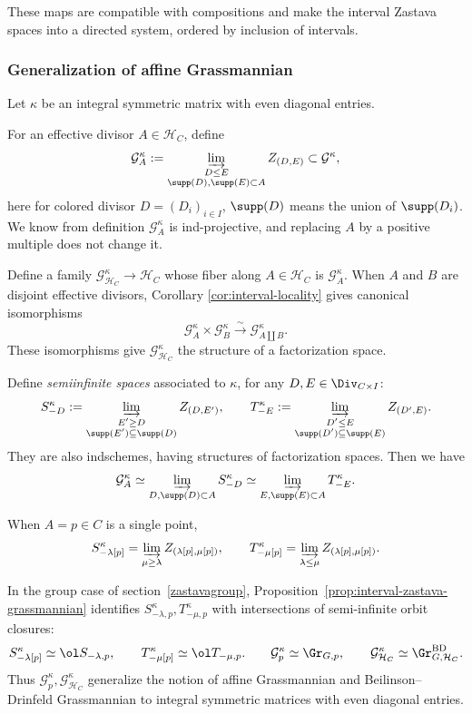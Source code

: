 \documentclass{amsart}
\numberwithin{equation}{section}
\numberwithin{figure}{section}
\theoremstyle{definition}
\theoremstyle{remark}
\renewcommand{\c}[1]{\mathcal{#1}}
\begin{document}
These maps are compatible with compositions and make the
interval Zastava spaces into a directed system, ordered by inclusion of intervals.

\subsubsection{Generalization of affine Grassmannian}
Let $\kappa$ be an integral symmetric matrix with even
diagonal entries.

For an effective divisor $A\in\c H_C$, define
\[\c G^\kappa_A
:=
\varinjlim_{\substack{	D\leq E\\\supp(D),\supp(E)\subset A}}
Z_{(D,E)}\subset\c G^\kappa,\]
here for colored divisor $D=(D_i)_{i\in I}$, $\supp(D)$ means the union of $\supp(D_i)$.
We know from definition $\c G^\kappa_A$ is ind-projective, and
replacing $A$ by a positive multiple does not change it.

Define a family $\c G^\kappa_{\c H_C}\to\c H_C$ whose fiber along $A\in \c H_C$ is $\c G^\kappa_A$. When $A$ and $B$ are disjoint effective divisors, Corollary \ref{cor:interval-locality} gives canonical isomorphisms
\[
\c G^\kappa_A\times\c G^\kappa_B
\xrightarrow{\sim}
\c G^\kappa_{A\coprod B}.
\]
These isomorphisms give
$\c G^\kappa_{\c H_C}$ the structure of a factorization space.

Define \textit{semiinfinite spaces} associated to $\kappa$, for any $D,E\in\Div_{C\times I}$:
\[
S_{-D}^\kappa
:=
\varinjlim_{\substack{E'\geq D\\\supp(E')\subseteq\supp(D)}}
Z_{(D,E')},
\qquad
T_{-E}^\kappa
:=
\varinjlim_{\substack{D'\leq E\\\supp(D')\subseteq\supp(E)}}
Z_{(D',E)}.
\]
They are also indschemes, having structures of factorization spaces.
Then we have
\[
\c G^\kappa_A
\simeq
\varinjlim_{D,\supp(D)\subset A}S^\kappa_{-D}
\simeq
\varinjlim_{E,\supp(E)\subset A}T^\kappa_{-E}.
\]


When $A=p\in C$ is a single point, 
\[
S^\kappa_{-\lambda[p]}
=
\varinjlim_{\mu\geq\lambda}
Z_{(\lambda[p],\mu[p])},
\qquad
T^\kappa_{-\mu[p]}
=
\varinjlim_{\lambda\leq\mu}
Z_{(\lambda[p],\mu[p])}.
\]

In the group case of section~\ref{zastavagroup},
Proposition~\ref{prop:interval-zastava-grassmannian}
identifies $S^\kappa_{-\lambda,p}, T^\kappa_{-\mu,p}$ with intersections of semi-infinite orbit closures:
\[
S^\kappa_{-\lambda[p]}\simeq\ol S_{-\lambda,p},
\qquad
T^\kappa_{-\mu[p]}\simeq\ol T_{-\mu,p}.
\qquad
\c G^\kappa_p\simeq\Gr_{G,p},
\qquad
\c G^\kappa_{\c H_C}
\simeq
\Gr^{\mathrm{BD}}_{G,\c H_C}.
\]
Thus $\c G^\kappa_p, \c G^\kappa_{\c H_C}$ generalize the notion of affine Grassmannian and Beilinson--Drinfeld Grassmannian 
to integral symmetric matrices with even diagonal entries.
\end{document}
